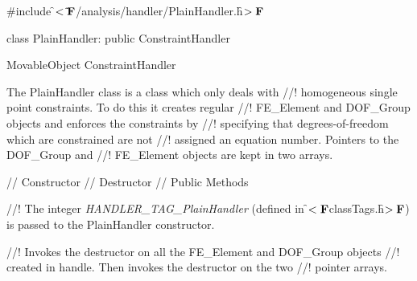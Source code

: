 
\indent \#include \f$<\tilde{ }{\bf F}$/analysis/handler/PlainHandler.h\f$>{\bf F}$

\indent class PlainHandler: public ConstraintHandler

\indent MovableObject
\indent\indent ConstraintHandler
\indent\indent{}

\indent The PlainHandler class is a class which only deals with
//! homogeneous single point constraints. To do this it creates regular
//! FE\_Element and DOF\_Group objects and enforces the constraints by
//! specifying that degrees-of-freedom which are constrained are not
//! assigned an equation number. Pointers to the DOF\_Group and
//! FE\_Element objects are kept in two arrays.

\indent // Constructor
\indent // Destructor
\indent // Public Methods

//! The integer {\em HANDLER\_TAG\_PlainHandler} (defined in
\f$<{\bf F}$classTags.h\f$>{\bf F}$) is passed to the PlainHandler constructor.

//! Invokes the destructor on all the FE\_Element and DOF\_Group objects
//! created in \p handle. Then invokes the destructor on the two
//! pointer arrays.


